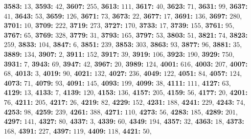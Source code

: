 \textsf{\bfseries 3583:} $13$, \textsf{\bfseries 3593:} $42$, \textsf{\bfseries 3607:} $255$, \textsf{\bfseries 3613:} $111$, \textsf{\bfseries 3617:} $40$, \textsf{\bfseries 3623:} $71$, \textsf{\bfseries 3631:} $99$, \textsf{\bfseries 3637:} $41$, \textsf{\bfseries 3643:} $53$, \textsf{\bfseries 3659:} $126$, \textsf{\bfseries 3671:} $73$, \textsf{\bfseries 3673:} $22$, \textsf{\bfseries 3677:} $17$, \textsf{\bfseries 3691:} $136$, \textsf{\bfseries 3697:} $280$, \textsf{\bfseries 3701:} $10$, \textsf{\bfseries 3709:} $222$, \textsf{\bfseries 3719:} $273$, \textsf{\bfseries 3727:} $170$, \textsf{\bfseries 3733:} $17$, \textsf{\bfseries 3739:} $155$, \textsf{\bfseries 3761:} $95$, \textsf{\bfseries 3767:} $65$, \textsf{\bfseries 3769:} $328$, \textsf{\bfseries 3779:} $31$, \textsf{\bfseries 3793:} $165$, \textsf{\bfseries 3797:} $53$, \textsf{\bfseries 3803:} $51$, \textsf{\bfseries 3821:} $74$, \textsf{\bfseries 3823:} $259$, \textsf{\bfseries 3833:} $104$, \textsf{\bfseries 3847:} $6$, \textsf{\bfseries 3851:} $239$, \textsf{\bfseries 3853:} $303$, \textsf{\bfseries 3863:} $93$, \textsf{\bfseries 3877:} $96$, \textsf{\bfseries 3881:} $35$, \textsf{\bfseries 3889:} $134$, \textsf{\bfseries 3907:} $2$, \textsf{\bfseries 3911:} $152$, \textsf{\bfseries 3917:} $39$, \textsf{\bfseries 3919:} $106$, \textsf{\bfseries 3923:} $190$, \textsf{\bfseries 3929:} $750$, \textsf{\bfseries 3931:} $7$, \textsf{\bfseries 3943:} $69$, \textsf{\bfseries 3947:} $42$, \textsf{\bfseries 3967:} $20$, \textsf{\bfseries 3989:} $124$, \textsf{\bfseries 4001:} $616$, \textsf{\bfseries 4003:} $207$, \textsf{\bfseries 4007:} $68$, \textsf{\bfseries 4013:} $3$, \textsf{\bfseries 4019:} $90$, \textsf{\bfseries 4021:} $132$, \textsf{\bfseries 4027:} $236$, \textsf{\bfseries 4049:} $122$, \textsf{\bfseries 4051:} $84$, \textsf{\bfseries 4057:} $124$, \textsf{\bfseries 4073:} $71$, \textsf{\bfseries 4079:} $93$, \textsf{\bfseries 4091:} $145$, \textsf{\bfseries 4093:} $199$, \textsf{\bfseries 4099:} $38$, \textsf{\bfseries 4111:} $111$, \textsf{\bfseries 4127:} $63$, \textsf{\bfseries 4129:} $13$, \textsf{\bfseries 4133:} $7$, \textsf{\bfseries 4139:} $120$, \textsf{\bfseries 4153:} $136$, \textsf{\bfseries 4157:} $205$, \textsf{\bfseries 4159:} $56$, \textsf{\bfseries 4177:} $20$, \textsf{\bfseries 4201:} $76$, \textsf{\bfseries 4211:} $205$, \textsf{\bfseries 4217:} $26$, \textsf{\bfseries 4219:} $82$, \textsf{\bfseries 4229:} $152$, \textsf{\bfseries 4231:} $188$, \textsf{\bfseries 4241:} $229$, \textsf{\bfseries 4243:} $74$, \textsf{\bfseries 4253:} $98$, \textsf{\bfseries 4259:} $239$, \textsf{\bfseries 4261:} $388$, \textsf{\bfseries 4271:} $110$, \textsf{\bfseries 4273:} $56$, \textsf{\bfseries 4283:} $185$, \textsf{\bfseries 4289:} $201$, \textsf{\bfseries 4297:} $141$, \textsf{\bfseries 4327:} $80$, \textsf{\bfseries 4337:} $3$, \textsf{\bfseries 4339:} $60$, \textsf{\bfseries 4349:} $194$, \textsf{\bfseries 4357:} $32$, \textsf{\bfseries 4363:} $18$, \textsf{\bfseries 4373:} $168$, \textsf{\bfseries 4391:} $227$, \textsf{\bfseries 4397:} $119$, \textsf{\bfseries 4409:} $118$, \textsf{\bfseries 4421:} $50$, 
